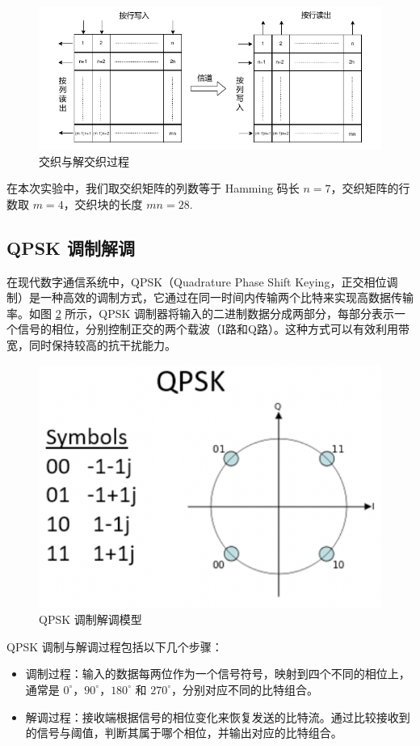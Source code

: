 \begin{figure}[ht]
    \centering
    \includegraphics[width=.8\textwidth]{static/interleave_model.pdf}
    \caption{交织与解交织过程}
    \label{fig:interleave_model}
\end{figure}

在本次实验中，我们取交织矩阵的列数等于 Hamming 码长 $n=7$，交织矩阵的行数取 $m=4$，交织块的长度 $mn=28$. 

\subsection{QPSK 调制解调}

在现代数字通信系统中，QPSK（Quadrature Phase Shift Keying，正交相位调制）是一种高效的调制方式，它通过在同一时间内传输两个比特来实现高数据传输率。如图 \ref{fig:qpsk_model} 所示，QPSK 调制器将输入的二进制数据分成两部分，每部分表示一个信号的相位，分别控制正交的两个载波（I路和Q路）。这种方式可以有效利用带宽，同时保持较高的抗干扰能力。

\begin{figure}[ht]
    \centering
    \includegraphics[width=.3\textwidth]{static/qpsk_model.png}
    \caption{QPSK 调制解调模型}
    \label{fig:qpsk_model}
\end{figure}

QPSK 调制与解调过程包括以下几个步骤：

\begin{itemize} 
    \item 调制过程：输入的数据每两位作为一个信号符号，映射到四个不同的相位上，通常是 $0^\circ$，$90^\circ$，$180^\circ$ 和 $270^\circ$，分别对应不同的比特组合。
    \item 解调过程：接收端根据信号的相位变化来恢复发送的比特流。通过比较接收到的信号与阈值，判断其属于哪个相位，并输出对应的比特组合。
\end{itemize}





